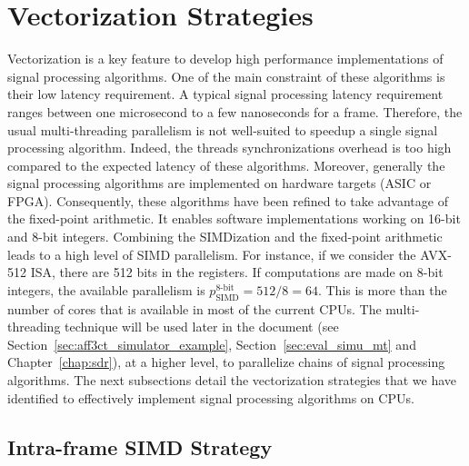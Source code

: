 \section{Vectorization Strategies}
\label{sec:opt_vec}

Vectorization is a key feature to develop high performance implementations of
signal processing algorithms. One of the main constraint of these algorithms is
their low latency requirement. A typical signal processing latency requirement
ranges between one microsecond to a few nanoseconds for a frame. Therefore, the
usual multi-threading parallelism is not well-suited to speedup a single signal
processing algorithm. Indeed, the threads synchronizations overhead is too high
compared to the expected latency of these algorithms. Moreover, generally the
signal processing algorithms are implemented on hardware targets (ASIC or FPGA).
Consequently, these algorithms have been refined to take advantage of the
fixed-point arithmetic. It enables software implementations working on 16-bit
and 8-bit integers. Combining the SIMDization and the fixed-point arithmetic
leads to a high level of SIMD parallelism. For instance, if we consider the
AVX-512 ISA, there are 512 bits in the registers. If computations are made on
8-bit integers, the available parallelism is $p^\text{8-bit}_\text{SIMD} = 512 /
8 = 64$. This is more than the number of cores that is available in most of the
current CPUs. The multi-threading technique will be used later in the document
(see Section~\ref{sec:aff3ct_simulator_example}, Section~\ref{sec:eval_simu_mt}
and Chapter~\ref{chap:sdr}), at a higher level, to parallelize chains of signal
processing algorithms. The next subsections detail the vectorization strategies
that we have identified to effectively implement signal processing algorithms on
CPUs.

\subsection{Intra-frame SIMD Strategy}
\label{sec:opt_vec_intra}


